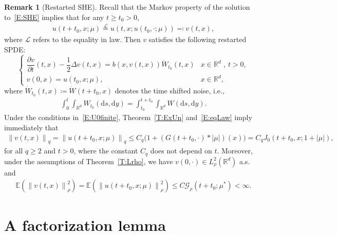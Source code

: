 \documentclass[a4paper,11pt]{article}%
\theoremstyle{plain}
\theoremstyle{definition}
\newtheorem{remark}[theorem]{Remark}
\numberwithin{equation}{section}
\newcommand{\R}{\mathbb{R}}
\newcommand{\E}{\mathbb{E}}
\newcommand{\Norm}[1]{\left\| #1 \right\|}
\newcommand{\ud}{\ensuremath{\mathrm{d}}}
\begin{document}
\begin{remark}[Restarted SHE]\label{R:Restat}
  Recall that the Markov property of the solution to~\eqref{E:SHE} implies that for any $t\ge
  t_0>0$,
  \begin{align}\label{E:eqLaw}
    u(t + t_0,x;\mu) \stackrel{\mathcal{L}}{=}
    u\left(t,x;u\left(t_0,\cdot;\mu\right)\right) \eqqcolon v(t,x),
  \end{align}
  where $\mathcal{L}$ refers to the equality in law. Then $v$ satisfies the following restarted
  SPDE:
  \begin{equation}\label{E:restart}
    \begin{cases}
      \dfrac{\partial v}{\partial t}(t,x)-\dfrac{1}{2}\Delta v(t,x) = b(x,v(t,x))\dot W_{t_0}(t,x) & \text{$x\in \R^d$ , $t>0$}, \\
      v(0,x) = u(t_0,x;\mu),                                                                       & x\in\R^d,
    \end{cases}
  \end{equation}
  where $\dot{W}_{t_0}(t,x) \coloneqq \dot{W}(t + t_0,x)$ denotes the time shifted noise, i.e.,
  \begin{align}\label{E:ShiftW}
    \int_0^t \int_{\R^d} W_{t_0}(\ud s, \ud y) = \int_{t_0}^{t+t_0} \int_{\R^d} W(\ud s, \ud y).
  \end{align}
  Under the conditions in~\eqref{E:U0finite}, Theorem~\ref{T:ExUn} and~\eqref{E:eqLaw} imply immediately
  that
  \begin{align}\label{E:MomBddRst}
  \Norm{v(t,x)}_q = \Norm{u(t+t_0,x;\mu)}_q
                  \le C_q\bigg(1 + (G(t+t_0, \cdot)* |\mu|)(x) \bigg)
                  = C_q J_0(t+t_0,x; 1+|\mu|),
  \end{align}
  for all $q\ge 2$ and $t>0$, where the constant $C_q$ does not depend on $t$. Moreover, under the
  assumptions of Theorem~\ref{T:Lrho}, we have $v(0,\cdot)\in L_\rho^2 (\R^d)$ a.s. and
  \begin{align}\label{E:MomRhoBddRst}
        \E\left(\Norm{v(t,x)}_\rho^2\right)
    = \E\left(\Norm{u(t+t_0,x;\mu)}_\rho^2\right)
    \le C \mathcal{G}_\rho(t+t_0;\mu^*)
    < \infty.
  \end{align}
\end{remark}

\section{A factorization lemma}\label{S:Factor}
\end{document}
